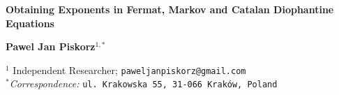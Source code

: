 \documentclass[11pt]{article}
\begin{document}
\noindent
\vspace{0.7cm}


{\LARGE\bfseries Obtaining Exponents in Fermat, Markov and Catalan Diophantine Equations}  %









\noindent
\textbf{Pawel Jan Piskorz}$^{1,*}$

\vspace{0.2cm}

\noindent

\hfill
\begin{minipage}[t]{0.95\textwidth} 

\noindent
$^{1}$ Independent Researcher; \texttt{paweljanpiskorz@gmail.com}\\
\noindent
$^{*}$\textit{Correspondence:} \texttt{ul.~Krakowska 55, 31-066 Kraków, Poland}

\vspace{1cm}



\end{minipage}
\end{document}
